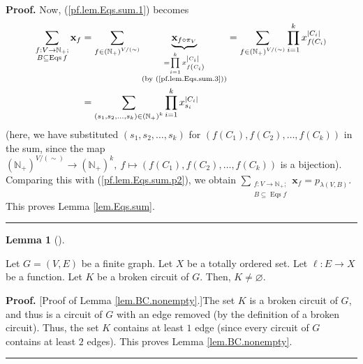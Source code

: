\documentclass[numbers=enddot,12pt,final,onecolumn,notitlepage]{scrartcl}%
\theoremstyle{definition}
\newtheorem{lem}[theo]{Lemma}
\newenvironment{lemma}[1][]
{\begin{lem}[#1]\begin{leftbar}}
{\end{leftbar}\end{lem}}
\newenvironment{proof}[1][Proof]{\noindent\textbf{#1.} }{\ \rule{0.5em}{0.5em}}
\newenvironment{verlong}{}{}
\newenvironment{vershort}{}{}
\let\sumnonlimits\sum
\let\prodnonlimits\prod
\renewcommand{\sum}{\sumnonlimits\limits}
\renewcommand{\prod}{\prodnonlimits\limits}
\begin{document}
\begin{verlong}
\begin{proof}
Now, (\ref{pf.lem.Eqs.sum.1}) becomes%
\begin{align*}
\sum_{\substack{f:V\rightarrow\mathbb{N}_{+};\\B\subseteq\operatorname*{Eqs}%
f}}\mathbf{x}_{f}  &  =\sum_{f\in\left(  \mathbb{N}_{+}\right)  ^{V/\left(
\sim\right)  }}\underbrace{\mathbf{x}_{f\circ\pi_{V}}}_{\substack{=\prod
_{i=1}^{k}x_{f\left(  C_{i}\right)  }^{\left\vert C_{i}\right\vert
}\\\text{(by (\ref{pf.lem.Eqs.sum.3}))}}}=\sum_{f\in\left(  \mathbb{N}%
_{+}\right)  ^{V/\left(  \sim\right)  }}\prod_{i=1}^{k}x_{f\left(
C_{i}\right)  }^{\left\vert C_{i}\right\vert }\\
&  =\sum_{\left(  s_{1},s_{2},\ldots,s_{k}\right)  \in\left(  \mathbb{N}%
_{+}\right)  ^{k}}\prod_{i=1}^{k}x_{s_{i}}^{\left\vert C_{i}\right\vert }%
\end{align*}
(here, we have substituted $\left(  s_{1},s_{2},\ldots,s_{k}\right)  $ for
$\left(  f\left(  C_{1}\right)  ,f\left(  C_{2}\right)  ,\ldots,f\left(
C_{k}\right)  \right)  $ in the sum, since the map $\left(  \mathbb{N}%
_{+}\right)  ^{V/\left(  \sim\right)  }\rightarrow\left(  \mathbb{N}%
_{+}\right)  ^{k},\ f\mapsto\left(  f\left(  C_{1}\right)  ,f\left(
C_{2}\right)  ,\ldots,f\left(  C_{k}\right)  \right)  $ is a bijection).
Comparing this with (\ref{pf.lem.Eqs.sum.p2}), we obtain $\sum
_{\substack{f:V\rightarrow\mathbb{N}_{+};\\B\subseteq\operatorname*{Eqs}%
f}}\mathbf{x}_{f}=p_{\lambda\left(  V,B\right)  }$. This proves Lemma
\ref{lem.Eqs.sum}.
\end{proof}
\end{verlong}

\begin{lemma}
\label{lem.BC.nonempty}Let $G=\left(  V,E\right)  $ be a finite graph. Let $X$
be a totally ordered set. Let $\ell:E\rightarrow X$ be a function. Let $K$ be
a broken circuit of $G$. Then, $K\neq\varnothing$.
\end{lemma}

\begin{vershort}
\begin{proof}
[Proof of Lemma \ref{lem.BC.nonempty}.]The set $K$ is a broken circuit of $G$,
and thus is a circuit of $G$ with an edge removed (by the definition of a
broken circuit). Thus, the set $K$ contains at least $1$ edge (since every
circuit of $G$ contains at least $2$ edges). This proves Lemma
\ref{lem.BC.nonempty}.
\end{proof}
\end{vershort}
\end{document}
